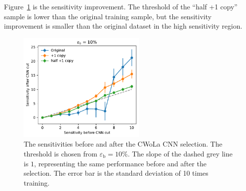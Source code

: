 \documentclass[12pt]{article}
\begin{document}
            Figure~\ref{fig:sensitivity_improvement_bkg_eff_01_half_copy_1} is the sensitivity improvement. The threshold of the ``half +1 copy'' sample is lower than the original training sample, but the sensitivity improvement is smaller than the original dataset in the high sensitivity region.
            \begin{figure}[htpb]
                \centering
                \includegraphics[width=0.55\textwidth]{HVmodel_sensitivity_improvement_bkg_eff_10_half_copy_1.pdf}
                \caption{The sensitivities before and after the CWoLa CNN selection. The threshold is chosen from $\varepsilon_{\text{b}} = 10\%$. The slope of the dashed grey line is $1$, representing the same performance before and after the selection. The error bar is the standard deviation of 10 times training.}
                \label{fig:sensitivity_improvement_bkg_eff_01_half_copy_1}
            \end{figure}
\end{document}
